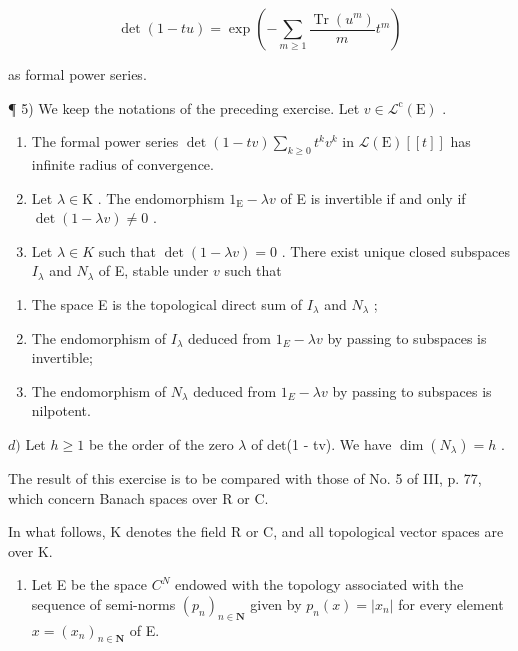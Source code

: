 \[
\det (1 - t u) = \exp \left(- \sum_ {m \geqslant 1} \frac {\operatorname{Tr} \left(u ^ {m}\right)}{m} t ^ {m}\right)
\]

as formal power series.

¶ 5) We keep the notations of the preceding exercise. Let \(v \in \mathcal{L}^{\mathrm{c}}(\mathrm{E})\) .

\begin{enumerate}
\def\labelenumi{\alph{enumi})}
\item
  The formal power series \(\det(1 - tv)\sum_{k\geqslant 0}t^{k}v^{k}\) in \(\mathcal{L}(\mathrm{E})[[t]]\) has infinite radius of convergence.
\item
  Let \(\lambda \in \mathrm{K}\) . The endomorphism \(1_{\mathrm{E}} - \lambda v\) of E is invertible if and only if \(\det(1 - \lambda v) \neq 0\) .
\item
  Let \(\lambda \in K\) such that \(\det(1 - \lambda v) = 0\) . There exist unique closed subspaces \(I_{\lambda}\) and \(N_{\lambda}\) of E, stable under \(v\) such that
\end{enumerate}

\begin{enumerate}
\def\labelenumi{(\roman{enumi})}
\item
  The space E is the topological direct sum of \(I_{\lambda}\) and \(N_{\lambda}\) ;
\item
  The endomorphism of \(I_{\lambda}\) deduced from \(1_{E} - \lambda v\) by passing to subspaces is invertible;
\item
  The endomorphism of \(N_{\lambda}\) deduced from \(1_{E} - \lambda v\) by passing to subspaces is nilpotent.
\end{enumerate}

\(d)\) Let \(h \geqslant 1\) be the order of the zero \(\lambda\) of det(1 - tv). We have \(\dim(N_{\lambda}) = h\) .

The result of this exercise is to be compared with those of No. 5 of III, p. 77, which concern Banach spaces over R or C.

In what follows, K denotes the field R or C, and all topological vector spaces are over K.

\begin{enumerate}
\def\labelenumi{\arabic{enumi})}
\setcounter{enumi}{5}
\tightlist
\item
  Let E be the space \(C^{N}\) endowed with the topology associated with the sequence of semi-norms \((p_{n})_{n\in\mathbf{N}}\) given by \(p_{n}(x)=|x_{n}|\) for every element \(x=(x_{n})_{n\in\mathbf{N}}\) of E.
\end{enumerate}

